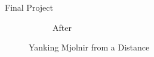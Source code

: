 \documentclass[final]{beamer}
\newlength{\onecolwid}
\begin{document}
\begin{frame}[t]
\begin{columns}[t]
\begin{column}{\onecolwid}
\begin{block}{Final Project}
\begin{itemize}
\begin{figure}[H]
\begin{subfigure}{0.5\linewidth}
                                    \caption{After}
                                \end{subfigure}
                                \caption{Yanking Mjolnir from a Distance}\label{fig:physics}
                            \end{figure}
                    \end{itemize}

                \end{block}

            \end{column} %

        \end{columns} %

    \end{frame} %
\end{document}

